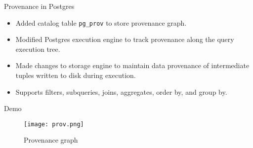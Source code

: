 \documentclass{beamer}
\begin{document}
\begin{frame}{Provenance in Postgres }
   \begin{center}
  \scalebox{0.6} {
    
    }
  \end{center}
  \begin{itemize}
  \item Added catalog table \texttt{pg\_prov} to store provenance graph.
  \item Modified Postgres execution engine to track provenance along the query execution tree.
  \item Made changes to storage engine to maintain data provenance of intermediate tuples written to disk during execution. 
  \item Supports filters, subqueries, joins, aggregates, order by, and group by. 
  \end{itemize}
\end{frame}

\begin{frame}{Demo}
  \begin{figure}
  \centering

  \texttt{[image: prov.png]}
  \caption{ Provenance graph}
  
\end{figure}

\end{frame}
\end{document}
